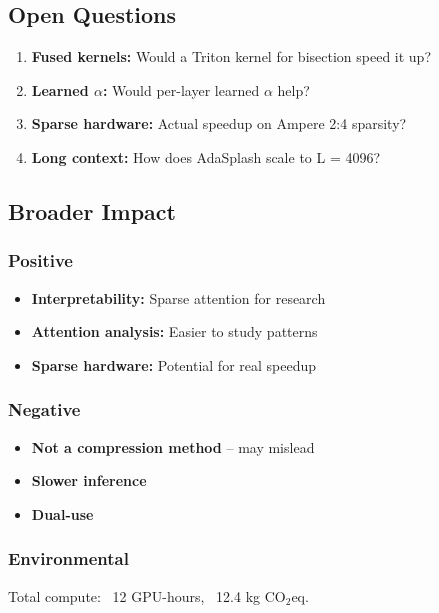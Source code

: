 \subsection{Open Questions}

\begin{enumerate}
\item \textbf{Fused kernels:} Would a Triton kernel for bisection speed it up?
\item \textbf{Learned $\alpha$:} Would per-layer learned $\alpha$ help?
\item \textbf{Sparse hardware:} Actual speedup on Ampere 2:4 sparsity?
\item \textbf{Long context:} How does AdaSplash scale to L = 4096?

\end{enumerate}
\subsection{Broader Impact}

\subsubsection{Positive}
\begin{itemize}
\item \textbf{Interpretability:} Sparse attention for research
\item \textbf{Attention analysis:} Easier to study patterns
\item \textbf{Sparse hardware:} Potential for real speedup

\end{itemize}
\subsubsection{Negative}
\begin{itemize}
\item \textbf{Not a compression method} -- may mislead
\item \textbf{Slower inference}
\item \textbf{Dual-use}

\end{itemize}
\subsubsection{Environmental}
Total compute: ~12 GPU-hours, ~12.4 kg CO$_2$eq.